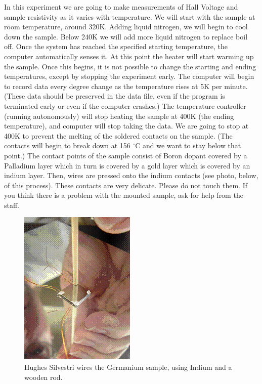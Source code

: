 \documentclass{../lab}
\begin{document}
In this experiment we are going to make measurements of Hall Voltage and sample resistivity as it varies with temperature. We will start with the sample at room temperature, around 320K. Adding liquid nitrogen, we will begin to cool down the sample. Below 240K we will add more liquid nitrogen to replace boil off. Once the system has reached the specified starting temperature, the computer automatically senses it. At this point the heater will start warming up the sample. Once this begins, it is not possible to change the starting and ending temperatures, except by stopping the experiment early. The computer will begin to record data every degree change as the temperature rises at 5K per minute. (These data should be preserved in the data file, even if the program is terminated early or even if the computer crashes.) The temperature controller (running autonomously) will stop heating the sample at 400K (the ending temperature), and computer will stop taking the data. We are going to stop at 400K to prevent the melting of the soldered contacts on the sample. (The contacts will begin to break down at 156 $^\circ$C and we want to stay below that point.) The contact points of the sample consist of Boron dopant covered by a Palladium layer which in turn is covered by a gold layer which is covered by an indium layer. Then, wires are pressed onto the indium contacts (see photo, below, of this process). These contacts are very delicate. Please do not touch them. If you think there is a problem with the mounted sample, ask for help from the staff.

\begin{figure}[h]
    \centering
    \includegraphics[width=0.5\linewidth]{images/WireGermaniumSample.png}
    \caption{Hughes Silvestri wires the Germanium sample, using Indium and a wooden rod.}
\end{figure}
\end{document}
